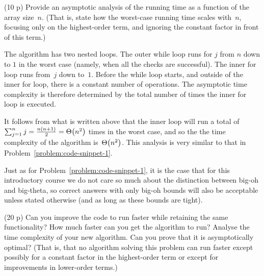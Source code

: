 \documentclass{jn-pset}
\begin{document}
\begin{problem}
\begin{subproblem}%
    {(10 p)}
    {\ignorespaces}
  Provide an asymptotic analysis of the running time
  as a function of the array size~$n$.
  (That is, state how the worst-case running time scales with~$n$,
  focusing only on the highest-order term, and ignoring the constant
  factor in front of this term.)
\end{subproblem}

\begin{solution}
  The algorithm has two nested loops. 
  The outer while loop runs for $j$ from $n$ down to $1$ in the worst case
  (namely, when all the checks are successful).
  The inner for loop runs from~$j$ down to~$1$.
  Before the while loop starts, and outside of the inner for loop,
  there is a constant number of operations. 
  The asymptotic time complexity is therefore determined by the total
  number of times the inner for loop is executed.

  It follows from what is written above that the inner loop will run a
  total of
  $
  \sum_{j=1}^{n} j
  =
  \frac{n(n+1)}{2}
  =
  \Theta \bigl( n^2 \bigr)
  $
  times in the worst case, and so the the time complexity of the
  algorithm
  is~$  \Theta \bigl( n^2 \bigr)$.
  This analysis is very similar to that in  
  Problem~\ref{problem:code-snippet-1}.

  Just as for
  Problem~\ref{problem:code-snippet-1},
  it is the case that
  for this introductory course we do not care so much
  about the distinction between big-oh and big-theta, so correct
  answers with only big-oh bounds will also be acceptable unless
  stated otherwise (and as long as these bounds are tight).
\end{solution}


\begin{subproblem}%
  {(20 p)}
  {\ignorespaces}
  Can you improve the code to run faster while retaining the same
  functionality?
  How much faster can you get the algorithm to run?
  Analyse the time complexity of your new algorithm.
  Can you prove that it is asymptotically optimal?
  (That is, that no algorithm solving this problem can run faster
  except possibly for a constant factor in the highest-order term or
  except for improvements in lower-order terms.)
\end{subproblem}


\end{problem}
\end{document}
